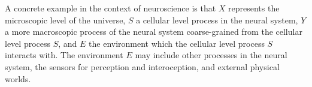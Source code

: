 \documentclass[utf8]{article}
\begin{document}
            
            
            
        
        A concrete example in the context of neuroscience is that $X$ represents the microscopic level of the universe, $S$ a cellular level process in the neural system, $Y$ a more macroscopic process of the neural system coarse-grained from the cellular level process $S$, and $E$ the environment which the cellular level process $S$ interacts with. The environment $E$ may include other processes in the neural system, the sensors for perception and interoception, and external physical worlds.\\
        
\end{document}
